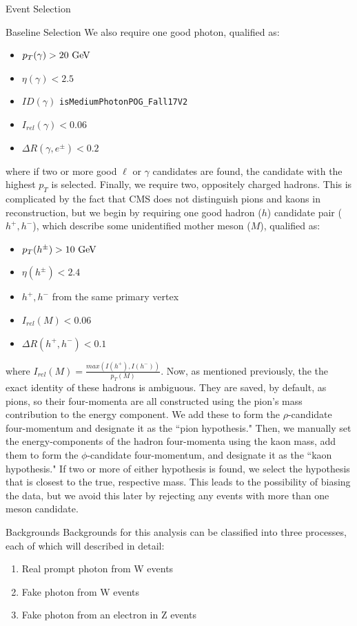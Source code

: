 \begin{section}{Event Selection}
\begin{subsection}{Baseline Selection}
\noindent We also require one good photon, qualified as:
\begin{itemize}
    \item $p_{T}(\gamma) > 20\textnormal{ GeV}$
    \item $\eta(\gamma) < 2.5$
    \item $ID(\gamma)$ \verb|isMediumPhotonPOG_Fall17V2|
    \item $I_{rel}(\gamma) < 0.06$
    \item $\Delta R(\gamma, e^{\pm}) < 0.2$
\end{itemize}
\noindent where if two or more good $\ell$ or $\gamma$ candidates are found, the candidate with the highest $p_{T}$ is selected. Finally, we require two, oppositely charged hadrons. This is complicated by the fact that CMS does not distinguish pions and kaons in reconstruction, but we begin by requiring one good hadron ($h$) candidate pair ($h^{+}, h^{-}$), which describe some unidentified mother meson ($M$), qualified as:
\begin{itemize}
    \item $p_{T}(h^{\pm}) > 10\textnormal{ GeV}$
    \item $\eta(h^{\pm}) < 2.4$
    \item $h^{+}, h^{-}$ from the same primary vertex
    \item $I_{rel}(M) < 0.06$
    \item $\Delta R(h^{+}, h^{-}) < 0.1$
\end{itemize}
\noindent where $I_{rel}(M) = \frac{max(I(h^{+}), I(h^{-}))}{p_{T}(M)}$. Now, as mentioned previously, the the exact identity of these hadrons is ambiguous. They are saved, by default, as pions, so their four-momenta are all constructed using the pion's mass contribution to the energy component. We add these to form the $\rho$-candidate four-momentum and designate it as the ``pion hypothesis." Then, we manually set the energy-components of the hadron four-momenta using the kaon mass, add them to form the $\phi$-candidate four-momentum, and designate it as the ``kaon hypothesis." If two or more of either hypothesis is found, we select the hypothesis that is closest to the true, respective mass. This leads to the possibility of biasing the data, but we avoid this later by rejecting any events with more than one meson candidate.
\end{subsection}
\end{section}

\begin{section}{Backgrounds}
Backgrounds for this analysis can be classified into three processes, each of which will described in detail:
\begin{enumerate}
    \item Real prompt photon from W events
    \item Fake photon from W events
    \item Fake photon from an electron in Z events
\end{enumerate}
\end{section}


